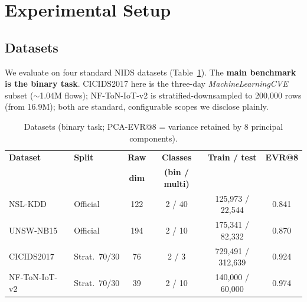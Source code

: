 \documentclass[preprint,11pt]{elsarticle}
\begin{document}
\section{Experimental Setup}
\subsection{Datasets}
We evaluate on four standard NIDS datasets (Table~\ref{tab:data}). The \textbf{main benchmark is the
binary task}. CICIDS2017 here is the three-day \emph{MachineLearningCVE} subset ($\sim$1.04M flows);
NF-ToN-IoT-v2 is stratified-downsampled to 200{,}000 rows (from 16.9M); both are standard, configurable
scopes we disclose plainly.

\begin{table}[t]
\centering
\caption{Datasets (binary task; PCA-EVR@8 = variance retained by 8 principal components).}
\label{tab:data}
\footnotesize
\renewcommand{\arraystretch}{1.15}
\setlength{\tabcolsep}{4pt}
\begin{tabular}{@{}llcccc@{}}
\toprule
\textbf{Dataset} & \textbf{Split} & \textbf{Raw} & \textbf{Classes} & \textbf{Train / test} & \textbf{EVR@8}\\
                 &                & \textbf{dim} & \textbf{(bin / multi)} & & \\
\midrule
NSL-KDD~\cite{nslkdd2009}    & Official      & 122 & 2 / 40 & 125{,}973 / 22{,}544  & 0.841\\
UNSW-NB15~\cite{unswnb15}    & Official      & 194 & 2 / 10 & 175{,}341 / 82{,}332  & 0.870\\
CICIDS2017~\cite{cicids2017} & Strat.\ 70/30 &  76 & 2 / 3  & 729{,}491 / 312{,}639 & 0.924\\
NF-ToN-IoT-v2~\cite{toniot}  & Strat.\ 70/30 &  39 & 2 / 10 & 140{,}000 / 60{,}000  & 0.974\\
\bottomrule
\end{tabular}
\end{table}
\end{document}
